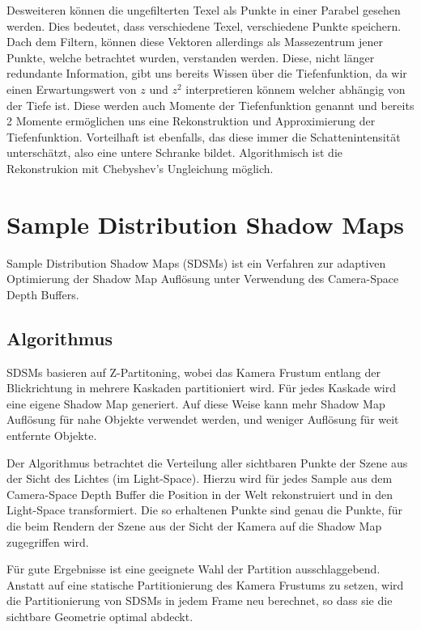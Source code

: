 \documentclass[runningheaders,a4paper]{llncs}
\begin{document}
Desweiteren können die ungefilterten Texel als Punkte in einer Parabel gesehen werden. Dies bedeutet, dass verschiedene Texel, verschiedene Punkte speichern. Dach dem Filtern, können diese Vektoren allerdings als Massezentrum jener Punkte, welche betrachtet wurden, verstanden werden. Diese, nicht länger redundante Information, gibt uns bereits Wissen über die Tiefenfunktion, da wir einen Erwartungswert von $z$ und $z^2$ interpretieren könnem welcher abhängig von der Tiefe ist. Diese werden auch Momente der Tiefenfunktion genannt und bereits 2 Momente ermöglichen uns eine Rekonstruktion und Approximierung der Tiefenfunktion. Vorteilhaft ist ebenfalls, das diese immer die Schattenintensität unterschätzt, also eine untere Schranke bildet. Algorithmisch ist die Rekonstrukion mit Chebyshev's Ungleichung möglich. \cite{donnelly2006variance}


\section{Sample Distribution Shadow Maps}

Sample Distribution Shadow Maps (SDSMs) ist ein Verfahren zur adaptiven Optimierung der Shadow Map Auflösung unter Verwendung des Camera-Space Depth Buffers.

\subsection{Algorithmus}

SDSMs basieren auf Z-Partitoning, wobei das Kamera Frustum entlang der Blickrichtung in mehrere Kaskaden partitioniert wird.
Für jedes Kaskade wird eine eigene Shadow Map generiert.
Auf diese Weise kann mehr Shadow Map Auflösung für nahe Objekte verwendet werden, und weniger Auflösung für weit entfernte Objekte.


Der Algorithmus betrachtet die Verteilung aller sichtbaren Punkte der Szene aus der Sicht des Lichtes (im Light-Space).
Hierzu wird für jedes Sample aus dem Camera-Space Depth Buffer die Position in der Welt rekonstruiert und in den Light-Space transformiert.
Die so erhaltenen Punkte sind genau die Punkte, für die beim Rendern der Szene aus der Sicht der Kamera auf die Shadow Map zugegriffen wird.


Für gute Ergebnisse ist eine geeignete Wahl der Partition ausschlaggebend.
Anstatt auf eine statische Partitionierung des Kamera Frustums \cite{pssm} zu setzen, wird die Partitionierung von SDSMs in jedem Frame neu berechnet, so dass sie die sichtbare Geometrie optimal abdeckt.
\end{document}
